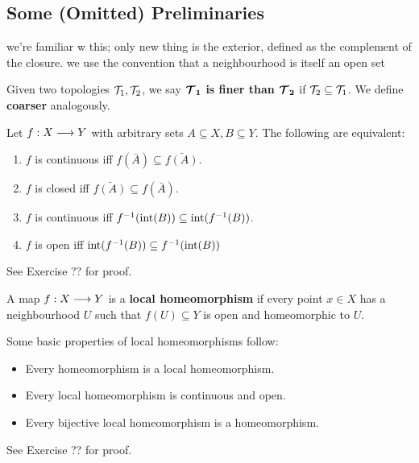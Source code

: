 \subsection{Some (Omitted) Preliminaries}

we're familiar w this; only new thing is the exterior, defined as the complement
of the closure. we use the convention that a neighbourhood is itself an open set

\begin{defn}
    Given two topologies $ \mathcal{T}_{1}, \mathcal{T}_{2} $, we say
    $ \bm{\mathcal{T}_{1}} $ \textbf{is finer than} $ \bm{\mathcal{T}_{2}} $ if
    $ \mathcal{T}_{2} \subseteq \mathcal{T}_{1} $. We define \textbf{coarser} analogously.
\end{defn}

\begin{prop}
    Let $ f:X \longrightarrow Y $ with arbitrary sets $ A \subseteq X, B \subseteq Y $.
    The following are equivalent:
    \begin{enumerate}
        \item $ f $ is continuous iff $ f(\bar{A}) \subseteq \bar{f(A)} $.
        \item $ f $ is closed iff $ \bar{f(A)} \subseteq f(\bar{A}) $.
        \item $ f $ is continuous iff $ f^{-1}(\operatorname{int}(B)) \subseteq
            \operatorname{int}(f^{-1}(B)) $.
        \item $ f $ is open iff $ \operatorname{int}(f^{-1}(B)) \subseteq
            f^{-1}(\operatorname{int}(B)) $
    \end{enumerate}
\end{prop}

See Exercise ?? for proof.

\begin{defn}
    A map $ f:X \longrightarrow Y $ is a \textbf{local homeomorphism} if every point
    $ x \in X $ has a neighbourhood $ U $ such that $ f(U) \subseteq Y $ is open
    and homeomorphic to $ U $.
\end{defn}

\begin{prop}
    Some basic properties of local homeomorphisms follow:
    \begin{itemize}
        \item Every homeomorphism is a local homeomorphism.
        \item Every local homeomorphism is continuous and open.
        \item Every bijective local homeomorphism is a homeomorphism.
    \end{itemize}
\end{prop}

See Exercise ?? for proof.

